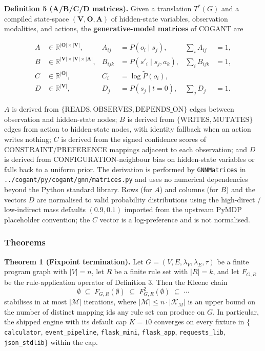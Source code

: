 \documentclass[
]{article}
\begin{document}
\textbf{Definition 5 (A/B/C/D matrices).} Given a translation
\(T^{*}(G)\) and a compiled state-space
\((\mathbf{V}, \mathbf{O}, \mathbf{A})\) of hidden-state variables,
observation modalities, and actions, the \textbf{generative-model
matrices} of COGANT are

\begin{align}
\label{eq:matrices-defn}
A &\in \mathbb{R}^{|\mathbf{O}| \times |\mathbf{V}|},    &A_{ij} &= P(o_i \mid s_j), & \sum_i A_{ij} &= 1, \\
B &\in \mathbb{R}^{|\mathbf{V}| \times |\mathbf{V}| \times |\mathbf{A}|}, & B_{i j k} &= P(s'_i \mid s_j, a_k), & \sum_i B_{ijk} &= 1, \\
C &\in \mathbb{R}^{|\mathbf{O}|}, & C_i &= \log \tilde{P}(o_i), & \\
D &\in \mathbb{R}^{|\mathbf{V}|}, & D_j &= P(s_j \mid t = 0), & \sum_j D_j &= 1.
\end{align}

\(A\) is derived from
\(\{\text{READS}, \text{OBSERVES}, \text{DEPENDS\_ON}\}\) edges between
observation and hidden-state nodes; \(B\) is derived from
\(\{\text{WRITES}, \text{MUTATES}\}\) edges from action to hidden-state
nodes, with identity fallback when an action writes nothing; \(C\) is
derived from the signed confidence scores of CONSTRAINT/PREFERENCE
mappings adjacent to each observation; and \(D\) is derived from
CONFIGURATION-neighbour bias on hidden-state variables or falls back to
a uniform prior. The derivation is performed by \texttt{GNNMatrices} in
\texttt{../cogant/py/cogant/gnn/matrices.py} and uses no numerical
dependencies beyond the Python standard library. Rows (for \(A\)) and
columns (for \(B\)) and the vectors \(D\) are normalised to valid
probability distributions using the high-direct / low-indirect mass
defaults \((0.9, 0.1)\) imported from the upstream PyMDP placeholder
convention; the \(C\) vector is a log-preference and is not normalised.

\subsubsection{Theorems}\label{theorems}

\textbf{Theorem 1 (Fixpoint termination).} Let
\(G = (V, E, \lambda_V, \lambda_E, \tau)\) be a finite program graph
with \(|V| = n\), let \(R\) be a finite rule set with \(|R| = k\), and
let \(F_{G,R}\) be the rule-application operator of Definition 3. Then
the Kleene chain \begin{equation}
\label{eq:kleene-chain}
\emptyset \;\subseteq\; F_{G,R}(\emptyset) \;\subseteq\; F_{G,R}^{2}(\emptyset) \;\subseteq\; \cdots
\end{equation} stabilises in at most \(|\mathcal{M}|\) iterations, where
\(|\mathcal{M}| \leq n \cdot |\mathcal{K}_M|\) is an upper bound on the
number of distinct mapping ids any rule set can produce on \(G\). In
particular, the shipped engine with its default cap \(K = 10\) converges
on every fixture in \(\{\)\texttt{calculator}, \texttt{event\_pipeline},
\texttt{flask\_mini}, \texttt{flask\_app}, \texttt{requests\_lib},
\texttt{json\_stdlib}\(\}\) within the cap.
\end{document}
